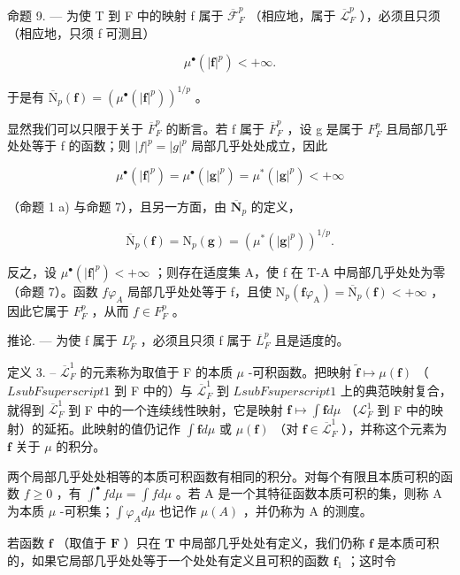 命题 9. --- 为使 T 到 F 中的映射 f 属于 \(\overline{\mathcal{F}}_F^p\) （相应地，属于 \(\overline{\mathcal{L}}_F^p\) ），必须且只须（相应地，只须 f 可测且）

\[
\mu^ {\bullet} (| \mathbf {f} | ^ {p}) <   + \infty .
\]

于是有 \(\overline{\mathrm{N}}_p(\mathbf{f}) = (\mu^\bullet (|\mathbf{f}|^p))^{1 / p}\) 。

显然我们可以只限于关于 \(\overline{F}_{F}^{p}\) 的断言。若 f 属于 \(\overline{F}_{F}^{p}\) ，设 g 是属于 \(F_{F}^{p}\) 且局部几乎处处等于 f 的函数；则 \(|f|^{p}=|g|^{p}\) 局部几乎处处成立，因此

\[
\mu^ {\bullet} (| \mathbf {f} | ^ {p}) = \mu^ {\bullet} (| \mathbf {g} | ^ {p}) = \mu^ {*} (| \mathbf {g} | ^ {p}) <   + \infty
\]

（命题 1 a) 与命题 7），且另一方面，由 \(\overline{\mathbf{N}}_p\) 的定义，

\[
\overline {{\mathrm{N}}} _ {p} (\mathbf {f}) = \mathrm{N} _ {p} (\mathbf {g}) = \left(\mu^ {*} (| \mathbf {g} | ^ {p})\right) ^ {1 / p}.
\]

反之，设 \(\mu^{\bullet}(|\mathbf{f}|^{p}) < +\infty\) ；则存在适度集 A，使 f 在 T-A 中局部几乎处处为零（命题 7）。函数 \(f\varphi_{A}\) 局部几乎处处等于 f，且使 \(\mathrm{N}_{p}(\mathbf{f}\varphi_{\mathrm{A}}) = \overline{\mathrm{N}}_{p}(\mathbf{f}) < +\infty\) ，因此它属于 \(F_{F}^{p}\) ，从而 \(f \in F_{F}^{p}\) 。

推论. --- 为使 f 属于 \(L_{F}^{p}\) ，必须且只须 f 属于 \(\overline{L}_{F}^{p}\) 且是适度的。

定义 3. -- \(\overline{\mathcal{L}}_F^1\) 的元素称为取值于 F 的本质 \(\mu\) -可积函数。把映射 \(\widetilde{\mathbf{f}} \mapsto \mu(\mathbf{f})\) （\(L sub F superscript 1\) 到 F 中的）与 \(\overline{\mathcal{L}}_F^1\) 到 \(L sub F superscript 1\) 上的典范映射复合，就得到 \(\overline{\mathcal{L}}_F^1\) 到 F 中的一个连续线性映射，它是映射 \(\mathbf{f} \mapsto \int \mathbf{f} d\mu\) （\(\mathcal{L}_F^1\) 到 F 中的映射）的延拓。此映射的值仍记作 \(\int \mathbf{f} d\mu\) 或 \(\mu(\mathbf{f})\) （对 \(\mathbf{f} \in \overline{\mathcal{L}}_F^1\) ），并称这个元素为 \(\mathbf{f}\) 关于 \(\mu\) 的积分。

两个局部几乎处处相等的本质可积函数有相同的积分。对每个有限且本质可积的函数 \(f \geqslant 0\) ，有 \(\int^{\bullet} f d\mu = \int f d\mu\) 。若 A 是一个其特征函数本质可积的集，则称 A 为本质 \(\mu\) -可积集；\(\int \varphi_{A} d\mu\) 也记作 \(\mu(A)\) ，并仍称为 A 的测度。

若函数 \(\mathbf{f}\) （取值于 \(\mathbf{F}\) ）只在 \(\mathbf{T}\) 中局部几乎处处有定义，我们仍称 \(\mathbf{f}\) 是本质可积的，如果它局部几乎处处等于一个处处有定义且可积的函数 \(\mathbf{f}_1\) ；这时令

